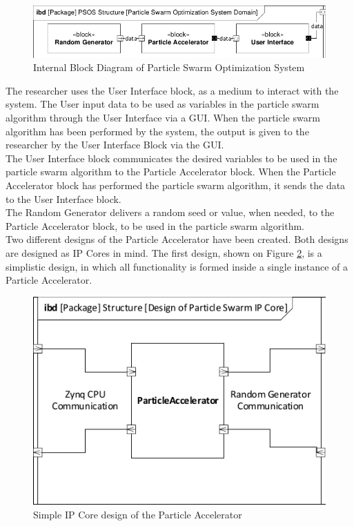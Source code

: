 \begin{figure}[H]
	\centering
	\includegraphics[width=0.8\linewidth]{diagram/ibd_particle_swarm_optimization_system.pdf}
	\caption{Internal Block Diagram of Particle Swarm Optimization System}
	\label{fig:ibd}
\end{figure}

The researcher uses the User Interface block, as a medium to interact with the system. The User input data to be used as variables in the particle swarm algorithm through the User Interface via a GUI. When the particle swarm algorithm has been performed by the system, the output is given to the researcher by the User Interface Block via the GUI.\\

The User Interface block communicates the desired variables to be used in the particle swarm algorithm to the Particle Accelerator block. When the Particle Accelerator block has performed the particle swarm algorithm, it sends the data to the User Interface block.\\

The Random Generator delivers a random seed or value, when needed, to the Particle Accelerator block, to be used in the particle swarm algorithm.\\

Two different designs of the Particle Accelerator have been created. Both designs are designed as IP Cores in mind. The first design, shown on Figure \ref{fig:ibdpsosarchitecture2}, is a simplistic design, in which all functionality is formed inside a single instance of a Particle Accelerator.

\begin{figure}[H]
	\centering
	\includegraphics[width=0.5\linewidth]{diagram/ibd_psos_architecture2}
	\caption{Simple IP Core design of the Particle Accelerator}
	\label{fig:ibdpsosarchitecture2}
\end{figure}

